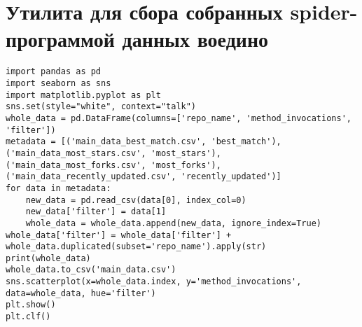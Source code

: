 \section{Утилита для сбора собранных spider-программой данных воедино}
\begin{lstlisting}[caption={Утилита для сбора собранных spider-программой данных воедино},label=form_main_data]
import pandas as pd
import seaborn as sns
import matplotlib.pyplot as plt
sns.set(style="white", context="talk")
whole_data = pd.DataFrame(columns=['repo_name', 'method_invocations', 'filter'])
metadata = [('main_data_best_match.csv', 'best_match'),
('main_data_most_stars.csv', 'most_stars'),
('main_data_most_forks.csv', 'most_forks'),
('main_data_recently_updated.csv', 'recently_updated')]
for data in metadata:
	new_data = pd.read_csv(data[0], index_col=0)
	new_data['filter'] = data[1]
	whole_data = whole_data.append(new_data, ignore_index=True)
whole_data['filter'] = whole_data['filter'] + whole_data.duplicated(subset='repo_name').apply(str)
print(whole_data)
whole_data.to_csv('main_data.csv')
sns.scatterplot(x=whole_data.index, y='method_invocations', data=whole_data, hue='filter')
plt.show()
plt.clf()
\end{lstlisting}
\newpage
